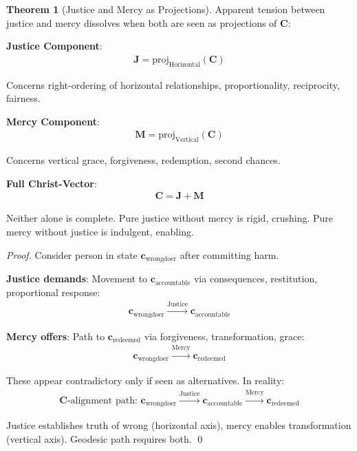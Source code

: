 \documentclass[11pt,a4paper]{article}
\theoremstyle{definition}
\newtheorem{theorem}{Theorem}[section]
\theoremstyle{remark}
\newcommand{\cc}{\mathbf{c}}
\begin{document}
\begin{small}
\begin{enumerate}
\begin{theorem}[Justice and Mercy as Projections]
Apparent tension between justice and mercy dissolves when both are seen as projections of \(\mathbf{C}\):

\textbf{Justice Component}:
\begin{align}
\mathbf{J} = \text{proj}_{\text{Horizontal}}(\mathbf{C})
\end{align}

Concerns right-ordering of horizontal relationships, proportionality, reciprocity, fairness.

\textbf{Mercy Component}:
\begin{align}
\mathbf{M} = \text{proj}_{\text{Vertical}}(\mathbf{C})
\end{align}

Concerns vertical grace, forgiveness, redemption, second chances.

\textbf{Full Christ-Vector}:
\begin{align}
\mathbf{C} = \mathbf{J} + \mathbf{M}
\end{align}

Neither alone is complete. Pure justice without mercy is rigid, crushing. Pure mercy without justice is indulgent, enabling.
\end{theorem}

\begin{proof}
Consider person in state \(\cc_{\text{wrongdoer}}\) after committing harm.

\textbf{Justice demands}: Movement to \(\cc_{\text{accountable}}\) via consequences, restitution, proportional response:
\begin{align}
\cc_{\text{wrongdoer}} \xrightarrow{\text{Justice}} \cc_{\text{accountable}}
\end{align}

\textbf{Mercy offers}: Path to \(\cc_{\text{redeemed}}\) via forgiveness, transformation, grace:
\begin{align}
\cc_{\text{wrongdoer}} \xrightarrow{\text{Mercy}} \cc_{\text{redeemed}}
\end{align}

These appear contradictory only if seen as alternatives. In reality:
\begin{align}
\mathbf{C}\text{-alignment path: } \cc_{\text{wrongdoer}} \xrightarrow{\text{Justice}} \cc_{\text{accountable}} \xrightarrow{\text{Mercy}} \cc_{\text{redeemed}}
\end{align}

Justice establishes truth of wrong (horizontal axis), mercy enables transformation (vertical axis). Geodesic path requires both. \qed
\end{proof}


\end{enumerate}
\end{small}
\end{document}
